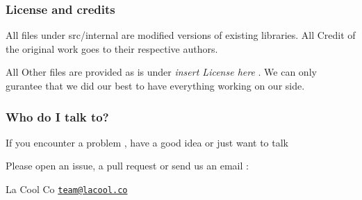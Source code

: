 \subsubsection*{License and credits}

All files under src/internal are modified versions of existing libraries. All Credit of the original work goes to their respective authors.

All Other files are provided as is under {\itshape insert License here} . We can only gurantee that we did our best to have everything working on our side.

\subsubsection*{Who do I talk to?}

If you encounter a problem , have a good idea or just want to talk

Please open an issue, a pull request or send us an email \+:

La Cool Co \href{mailto:team@lacool.co}{\tt team@lacool.\+co} 